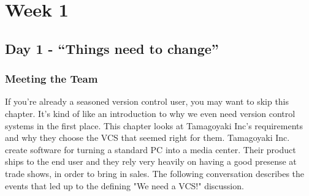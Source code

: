 \chapter{Week 1}
\section{Day 1 - ``Things need to change''}
\subsection{Meeting the Team}

If you're already a seasoned version control user, you may want to skip this chapter.  It's kind of like an introduction to why we even need version control systems in the first place.  This chapter looks at Tamagoyaki Inc's requirements and why they choose the VCS that seemed right for them.  Tamagoyaki Inc. create software for turning a standard PC into a media center.  Their product ships to the end user and they rely very heavily on having a good presense at trade shows, in order to bring in sales.  The following conversation describes the events that led up to the defining "We need a VCS!" discussion.

